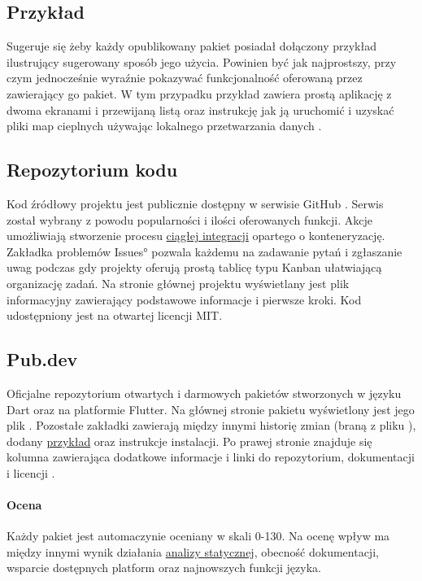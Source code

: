 \subsection{Przykład}
\label{sec:rs_example}
Sugeruje się żeby każdy opublikowany pakiet posiadał dołączony przykład ilustrujący sugerowany sposób jego użycia. Powinien być jak najprostszy, przy czym jednocześnie wyraźnie pokazywać funkcjonalność oferowaną przez zawierający go pakiet. W tym przypadku przykład zawiera prostą aplikację z dwoma ekranami i przewijaną listą oraz instrukcję jak ją uruchomić i uzyskać pliki map cieplnych używając lokalnego przetwarzania danych \cite{RS_Example}.

\subsection{Repozytorium kodu}
Kod źródłowy projektu jest publicznie dostępny w serwisie GitHub \cite{RoundSpot_GitHub}. Serwis został wybrany z powodu popularności i ilości oferowanych funkcji. Akcje umożliwiają stworzenie procesu \hyperref[sec:rs_ci]{ciągłej integracji} opartego o konteneryzację. Zakładka problemów \ang{Issues} pozwala każdemu na zadawanie pytań i zgłaszanie uwag podczas gdy projekty oferują prostą tablicę typu Kanban ułatwiającą organizację zadań. Na stronie głównej projektu wyświetlany jest plik informacyjny  zawierający podstawowe informacje i pierwsze kroki. Kod udostępniony jest na otwartej licencji MIT.

\subsection{Pub.dev}
Oficjalne repozytorium otwartych i darmowych pakietów stworzonych w języku Dart oraz na platformie Flutter. Na głównej stronie pakietu wyświetlony jest jego plik . Pozostałe zakładki zawierają między innymi historię zmian (braną z pliku ), dodany \hyperref[sec:rs_example]{przykład} oraz instrukcje instalacji. Po prawej stronie znajduje się kolumna zawierająca dodatkowe informacje i linki do repozytorium, dokumentacji i licencji \cite{RS_Pub_dev}.

\paragraph{Ocena} Każdy pakiet jest automaczynie oceniany w skali 0-130. Na ocenę wpływ ma między innymi wynik działania \hyperref[par:static_analysis]{analizy statycznej}, obecność dokumentacji, wsparcie dostępnych platform oraz najnowszych funkcji języka.


